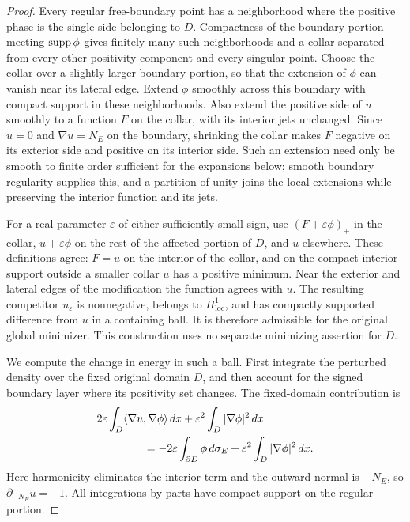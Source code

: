 \begin{proof}
Every regular free-boundary point has a neighborhood where the
positive phase is the single side belonging to $D$. Compactness of
the boundary portion meeting $\operatorname{supp}\phi$ gives finitely many such
neighborhoods and a collar separated from every other positivity
component and every singular point. Choose the collar over a slightly
larger boundary portion, so that the extension of $\phi$ can vanish
near its lateral edge. Extend $\phi$ smoothly across this boundary
with compact support in these neighborhoods. Also extend the positive
side of $u$ smoothly to a function $F$ on the collar, with its interior
jets unchanged. Since $u=0$ and $\nabla u=N_E$ on the boundary,
shrinking the collar makes $F$ negative on its exterior side and
positive on its interior side. Such an extension need only be smooth
to finite order sufficient for the expansions below; smooth boundary
regularity supplies this, and a partition of unity joins the local
extensions while preserving the interior function and its jets.

For a real parameter $\varepsilon$ of either sufficiently small sign,
use $(F+\varepsilon\phi)_+$ in the collar,
$u+\varepsilon\phi$ on the rest of the affected portion of $D$, and
$u$ elsewhere. These definitions agree: $F=u$ on the interior of the
collar, and on the compact interior support outside a smaller collar
$u$ has a positive minimum. Near the exterior and lateral edges of
the modification the function agrees with $u$.
The resulting competitor $u_\varepsilon$ is nonnegative, belongs to
$H^1_{\mathrm{loc}}$, and has compactly supported difference from $u$ in a containing
ball. It is therefore admissible for the original global minimizer.
This construction uses no separate minimizing assertion for $D$.

We compute the change in energy in such a ball. First integrate the
perturbed density over the fixed original domain $D$, and then account
for the signed boundary layer where its positivity set changes.
The fixed-domain contribution is
\begin{align}
 &2\varepsilon\int_D\langle\nabla u,\nabla\phi\rangle\,dx
       +\varepsilon^2\int_D|\nabla\phi|^2\,dx\notag\\
 &\hspace{15mm}=-2\varepsilon\int_{\partial D}\phi\,d\sigma_E
       +\varepsilon^2\int_D|\nabla\phi|^2\,dx.
 \label{geo:fixed-domain-variation}
\end{align}
Here harmonicity eliminates the interior term and the outward normal
is $-N_E$, so $\partial_{-N_E}u=-1$.
All integrations by parts have compact support on the regular portion.


\end{proof}
